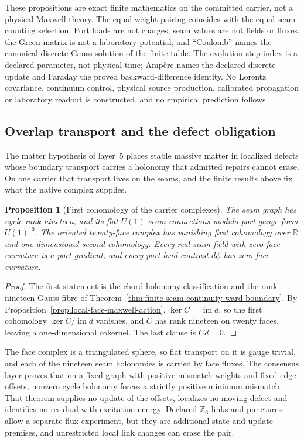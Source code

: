 \documentclass[11pt]{article}
\newtheorem{proposition}[theorem]{Proposition}
\theoremstyle{remark}
\theoremstyle{plain}
\begin{document}
These propositions are exact finite mathematics on the committed carrier,
not a physical Maxwell theory. The equal-weight pairing coincides with the
equal seam-counting selection. Port loads are not charges, seam values are
not fields or fluxes, the Green matrix is not a laboratory potential, and
``Coulomb'' names the canonical discrete Gauss solution of the finite table.
The evolution step index is a declared parameter, not physical time;
Amp\`ere names the declared discrete update and Faraday the proved
backward-difference identity. No Lorentz covariance, continuum control,
physical source production, calibrated propagation or laboratory readout is
constructed, and no empirical prediction follows.


\subsection{Overlap transport and the defect obligation}
\label{subsec:carrier-transport-defects}

The matter hypothesis of layer~5 places stable massive matter in localized
defects whose boundary transport carries a holonomy that admitted repairs
cannot erase. On one carrier that transport lives on the seams, and the
finite results above fix what the native complex supplies.

\begin{proposition}[First cohomology of the carrier complexes]
\label{prop:carrier-complex-cohomology}
The seam graph has cycle rank nineteen, and its flat \(U(1)\) seam
connections modulo port gauge form \(U(1)^{19}\). The oriented twenty-face
complex has vanishing first cohomology over \(\mathbb R\) and one-dimensional
second cohomology. Every real seam field with zero face curvature is a port
gradient, and every port-load contrast \(d\phi\) has zero face curvature.
\end{proposition}

\begin{proof}
The first statement is the chord-holonomy classification and the
rank-nineteen Gauss fibre of
Theorem~\ref{thm:finite-seam-continuity-ward-boundary}. By
Proposition~\ref{prop:local-face-maxwell-action}, \(\ker C=\operatorname{im}d\),
so the first cohomology \(\ker C/\operatorname{im}d\) vanishes, and \(C\) has
rank nineteen on twenty faces, leaving a one-dimensional cokernel. The last
clause is \(Cd=0\).
\end{proof}

The face complex is a triangulated sphere, so flat transport on it is gauge
trivial, and each of the nineteen seam holonomies is carried by face fluxes. The consensus layer
proves that on a fixed graph with positive mismatch weights and fixed edge
offsets, nonzero cycle holonomy forces a strictly positive minimum
mismatch~\cite{ophconsensus}. That theorem supplies no update of the offsets,
localizes no moving defect and identifies no residual with excitation energy.
Declared \(\mathbb Z_6\) links and punctures allow a separate flux experiment,
but they are additional state and update premises, and unrestricted local
link changes can erase the pair.
\end{document}

